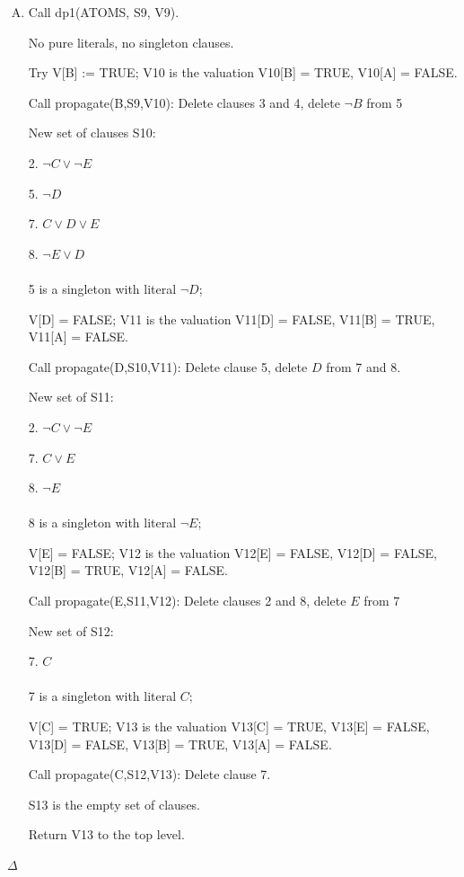 \documentclass[11pt]{article}
\begin{document}
	\begin{enumerate}[V.]
		\item Call dp1(ATOMS, S9, V9).
		
		No pure literals, no singleton clauses.
		
		Try V[B] := TRUE; V10 is the valuation V10[B] = TRUE, V10[A] = FALSE.
		
		Call propagate(B,S9,V10): Delete clauses 3 and 4, delete $ \neg B $ from 5
		
		New set of clauses S10:
		
		2. $ \neg C \vee \neg E $
		
		5. $ \neg D $
		
		7. $ C\vee D\vee E $
		
		8. $ \neg E\vee D $
		\\
		\\
		5 is a singleton with literal $ \neg D $;
		
		V[D] = FALSE; V11 is the valuation V11[D] = FALSE, V11[B] = TRUE, V11[A] = FALSE.
		
		Call propagate(D,S10,V11): Delete clause 5, delete $ D $ from 7 and 8.
		
		New set of S11:
		
		2. $ \neg C \vee \neg E $
		
		7. $ C\vee E $
		
		8. $ \neg E $
		\\
		\\
		8 is a singleton with literal $ \neg E $;
		
		V[E] = FALSE; V12 is the valuation V12[E] = FALSE, V12[D] = FALSE, V12[B] = TRUE, V12[A] = FALSE.
		
		Call propagate(E,S11,V12): Delete clauses 2 and 8, delete $ E $ from 7
		
		New set of S12:
		
		7. $ C $
		\\
		\\
		7 is a singleton with literal $ C $;
		
		V[C] = TRUE; V13 is the valuation V13[C] = TRUE, V13[E] = FALSE, V13[D] = FALSE, V13[B] = TRUE, V13[A] = FALSE.
		
		Call propagate(C,S12,V13): Delete clause 7.
		
		S13 is the empty set of clauses.
		
		Return V13 to the top level.
	\end{enumerate}
	$ \Delta $
\end{document}
